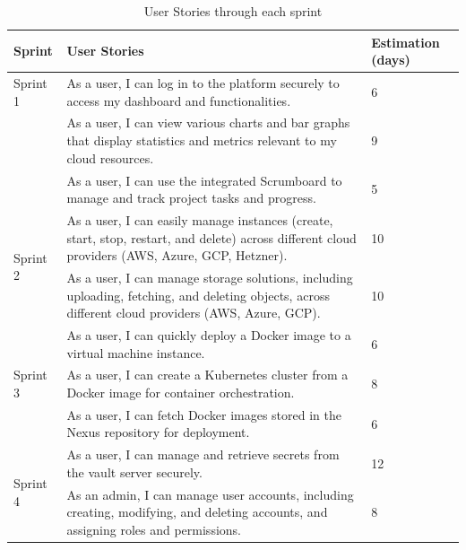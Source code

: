 \begin{table}[h!]
\centering
\caption{User Stories through each sprint}
\label{tab:sprints_backlog}
\begin{tabular}{|p{2cm}|p{10cm}|p{2cm}|}
\hline
\textbf{Sprint} & \textbf{User Stories} & \textbf{Estimation (days)} \\ \hline
Sprint 1 & As a user, I can log in to the platform securely to access my dashboard and functionalities. & 6 \\ \cline{2-3}
 & As a user, I can view various charts and bar graphs that display statistics and metrics relevant to my cloud resources. & 9 \\ \cline{2-3}
 & As a user, I can use the integrated Scrumboard to manage and track project tasks and progress. & 5 \\ \hline

\multirow{2}{*}{Sprint 2} & As a user, I can easily manage instances (create, start, stop, restart, and delete) across different cloud providers (AWS, Azure, GCP, Hetzner). & 10 \\ \cline{2-3}
 & As a user, I can manage storage solutions, including uploading, fetching, and deleting objects, across different cloud providers (AWS, Azure, GCP). & 10 \\ \hline

\multirow{3}{*}{Sprint 3} & As a user, I can quickly deploy a Docker image to a virtual machine instance. & 6 \\ \cline{2-3}
 & As a user, I can create a Kubernetes cluster from a Docker image for container orchestration. & 8 \\ \cline{2-3}
 & As a user, I can fetch Docker images stored in the Nexus repository for deployment. & 6 \\ \hline

\multirow{2}{*}{Sprint 4} & As a user, I can manage and retrieve secrets from the vault server securely. & 12 \\ \cline{2-3}
 & As an admin, I can manage user accounts, including creating, modifying, and deleting accounts, and assigning roles and permissions. & 8 \\ \hline
\end{tabular}
\end{table}

